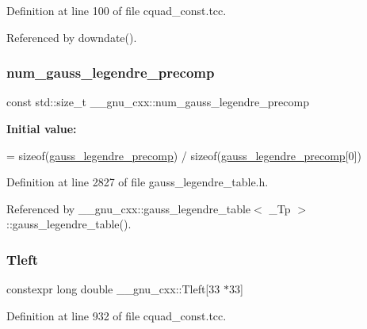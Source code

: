 Definition at line 100 of file cquad\+\_\+const.\+tcc.



Referenced by downdate().

\mbox{\label{namespace____gnu__cxx_a6b3fdb3b976805e974e633eae91469ed}} 
\subsubsection{\texorpdfstring{num\+\_\+gauss\+\_\+legendre\+\_\+precomp}{num\_gauss\_legendre\_precomp}}
{\footnotesize\ttfamily const std\+::size\+\_\+t \+\_\+\+\_\+gnu\+\_\+cxx\+::num\+\_\+gauss\+\_\+legendre\+\_\+precomp}

{\bfseries Initial value\+:}
\begin{DoxyCode}
= \textcolor{keyword}{sizeof}(\hyperlink{namespace____gnu__cxx_a2e3dcc11970f62e2c7e9d81502b2f84b}{gauss\_legendre\_precomp})
                      / \textcolor{keyword}{sizeof}(\hyperlink{namespace____gnu__cxx_a2e3dcc11970f62e2c7e9d81502b2f84b}{gauss\_legendre\_precomp}[0])
\end{DoxyCode}


Definition at line 2827 of file gauss\+\_\+legendre\+\_\+table.\+h.



Referenced by \+\_\+\+\_\+gnu\+\_\+cxx\+::gauss\+\_\+legendre\+\_\+table$<$ \+\_\+\+Tp $>$\+::gauss\+\_\+legendre\+\_\+table().

\mbox{\label{namespace____gnu__cxx_a7e499d0005aca8d0d6dd4eb30c0bc008}} 
\subsubsection{\texorpdfstring{Tleft}{Tleft}}
{\footnotesize\ttfamily constexpr long double \+\_\+\+\_\+gnu\+\_\+cxx\+::\+Tleft\mbox{[}33 $\ast$33\mbox{]}}



Definition at line 932 of file cquad\+\_\+const.\+tcc.



